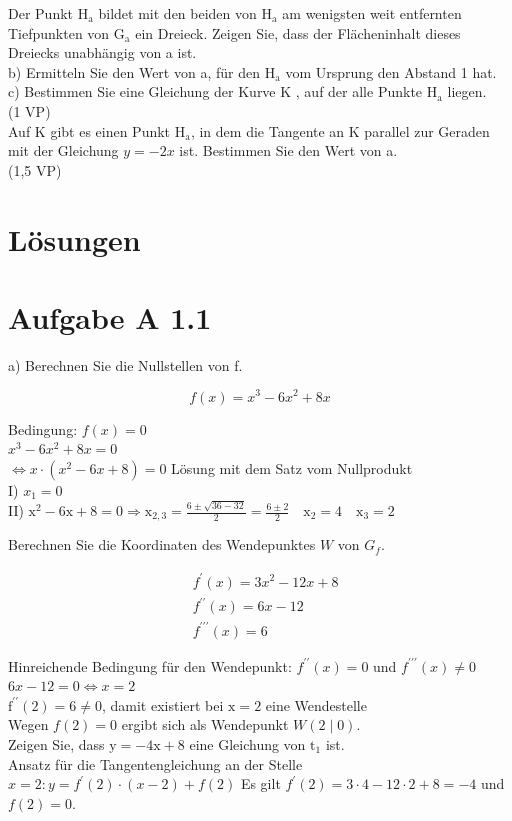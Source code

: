 \documentclass[10pt]{article}
\begin{document}
Der Punkt $\mathrm{H}_{\mathrm{a}}$ bildet mit den beiden von $\mathrm{H}_{\mathrm{a}}$ am wenigsten weit entfernten Tiefpunkten von $\mathrm{G}_{\mathrm{a}}$ ein Dreieck. Zeigen Sie, dass der Flächeninhalt dieses Dreiecks unabhängig von a ist.\\
b) Ermitteln Sie den Wert von a, für den $\mathrm{H}_{\mathrm{a}}$ vom Ursprung den Abstand 1 hat.\\
c) Bestimmen Sie eine Gleichung der Kurve K , auf der alle Punkte $\mathrm{H}_{\mathrm{a}}$ liegen.\\
(1 VP)\\
Auf K gibt es einen Punkt $\mathrm{H}_{\mathrm{a}}$, in dem die Tangente an K parallel zur Geraden mit der Gleichung $y=-2 x$ ist. Bestimmen Sie den Wert von a.\\
(1,5 VP)

\section*{Lösungen}
\section*{Aufgabe A 1.1}
a) Berechnen Sie die Nullstellen von f.

$$
f(x)=x^{3}-6 x^{2}+8 x
$$

Bedingung: $f(x)=0$\\
$x^{3}-6 x^{2}+8 x=0$\\
$\Leftrightarrow x \cdot\left(x^{2}-6 x+8\right)=0$ Lösung mit dem Satz vom Nullprodukt\\
I) $x_{1}=0$\\
II) $\mathrm{x}^{2}-6 \mathrm{x}+8=0 \Rightarrow \mathrm{x}_{2,3}=\frac{6 \pm \sqrt{36-32}}{2}=\frac{6 \pm 2}{2} \quad \mathrm{x}_{2}=4 \quad \mathrm{x}_{3}=2$

Berechnen Sie die Koordinaten des Wendepunktes $W$ von $G_{f}$.

$$
\begin{aligned}
& f^{\prime}(x)=3 x^{2}-12 x+8 \\
& f^{\prime \prime}(x)=6 x-12 \\
& f^{\prime \prime \prime}(x)=6
\end{aligned}
$$

Hinreichende Bedingung für den Wendepunkt: $f^{\prime \prime}(x)=0$ und $f^{\prime \prime \prime}(x) \neq 0$\\
$6 x-12=0 \Leftrightarrow x=2$\\
$\mathrm{f}^{\prime \prime}(2)=6 \neq 0$, damit existiert bei $\mathrm{x}=2$ eine Wendestelle\\
Wegen $f(2)=0$ ergibt sich als Wendepunkt $W(2 \mid 0)$.\\
Zeigen Sie, dass $\mathrm{y}=-4 \mathrm{x}+8$ eine Gleichung von $\mathrm{t}_{1}$ ist.\\
Ansatz für die Tangentengleichung an der Stelle $x=2: y=f^{\prime}(2) \cdot(x-2)+f(2)$ Es gilt $f^{\prime}(2)=3 \cdot 4-12 \cdot 2+8=-4$ und $f(2)=0$.
\end{document}
